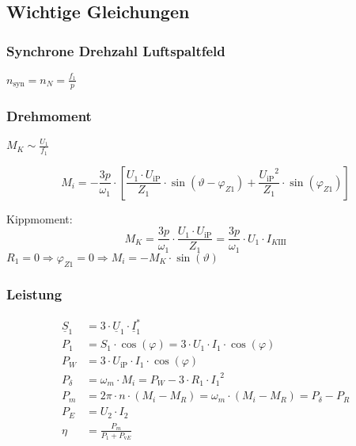 \begin{sectionbox}
\subsection{Wichtige Gleichungen}
\subsubsection{Synchrone Drehzahl Luftspaltfeld}
\begin{emphbox}
  $n_\text{syn} = n_N = \frac{f_1}{p}$
\end{emphbox}

\subsubsection{Drehmoment}
\begin{emphbox}
  $M_K\sim \frac{U_1}{f_1}$
\end{emphbox}
\begin{emphbox}
  \[M_i = -\frac{3p}{\omega_1}\cdot\left[\frac{U_1\cdot U_\text{iP}}{Z_1}\cdot\sin{\left(\vartheta - \varphi_{Z1}\right)} + \frac{{U_\text{iP}}^2}{Z_1}\cdot\sin{\left(\varphi_{Z1}\right)}\right]\]
\end{emphbox}
Kippmoment:
\[M_K = \frac{3p}{\omega_1}\cdot\frac{U_1\cdot U_\text{iP}}{Z_1} = \frac{3p}{\omega_1}\cdot U_1\cdot I_{K\textrm{III}}\]
$R_1 = 0 \Rightarrow \varphi_{Z1} = 0 \Rightarrow M_i = -M_K\cdot\sin(\vartheta)$

\subsubsection{Leistung}
\begin{align*}
\underline{S}_1 &= 3\cdot \underline{U}_1\cdot\underline{I}_1^*\\
P_1 &= S_1 \cdot\cos{(\varphi)} = 3\cdot U_1\cdot I_1\cdot\cos{(\varphi)}\\
P_W &= 3\cdot U_\text{iP}\cdot I_1\cdot\cos{(\varphi)}\\
P_\delta &= \omega_m\cdot M_i = P_W - 3\cdot R_1\cdot {I_1}^2\\
P_m &= 2\pi\cdot n\cdot (M_i - M_R) = \omega_m\cdot (M_i - M_R) = P_\delta - P_R\\
P_E &= U_2\cdot I_2\\
\eta &= \frac{P_m}{P_1 + P_{\text{v}E}}
\end{align*}
\end{sectionbox}

